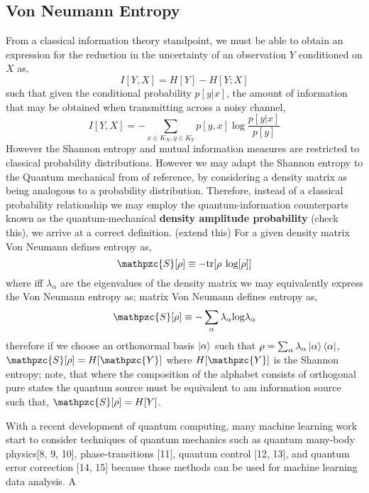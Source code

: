 \documentclass[7pt]{article}
\begin{document}
\newpage
\subsection{Von Neumann Entropy}
From a classical information theory standpoint, we must be able to obtain an expression for the reduction in the uncertainty of an observation $Y$ conditioned on $X$ as,
\begin{equation}
I[Y,X] = H[Y] - H[Y;X]
\end{equation}
such that given the conditional probability $p[y|x]$, the amount of information that may be obtained when transmitting across a noisy channel,
\begin{equation}
I[Y,X] = - \sum_{x \in K_X,y \in K_Y } p[y,x] \log \dfrac{ p[y|x]}{p[y]}
\end{equation}
However the Shannon entropy and mutual information measures are restricted to classical probability distributions. However we may adapt the Shannon entropy to the Quantum mechanical from of reference, by considering a density matrix as being analogous to a probability distribution. Therefore, instead of a classical probability relationship we may employ the quantum-information counterparts known as the quantum-mechanical \textbf{density amplitude probability} (check this), we arrive at a correct definition.  (extend this) For a given density matrix Von Neumann defines entropy as,
\begin{equation}
\mathpzc{S} [\rho] \equiv - \text{tr} [ \rho \: \log [\rho] ]
\end{equation}
where iff $\lambda_{\alpha}$ are the eigenvalues of the density matrix we may equivalently express the Von Neumann entropy as;
matrix Von Neumann defines entropy as,
\begin{equation}
\mathpzc{S} [\rho] \equiv - \sum_{\alpha} \lambda_{\alpha} \text{log} \lambda_{\alpha}
\end{equation}
therefore if we choose an orthonormal basis $\ket{\alpha}$ such that $\rho = \sum_{\alpha} \lambda_{\alpha} \ket{\alpha}\bra{\alpha}$,
$
\mathpzc{S} [\rho] = H[\mathpzc{Y}]
$
where $H[\mathpzc{Y}]$ is the Shannon entropy; note, that where the composition of the alphabet consists of orthogonal pure states the quantum source must be  equivalent to am information source such that,
$
\mathpzc{S} [\rho] = H[Y]
$.
\newpage

With a recent development of quantum computing, many machine learning work start to consider techniques of quantum mechanics such as quantum many-body physics[8, 9, 10],
phase-transitions [11], quantum control [12, 13], and quantum error correction [14, 15] because those methods can
be used for machine learning data analysis. A
\end{document}

